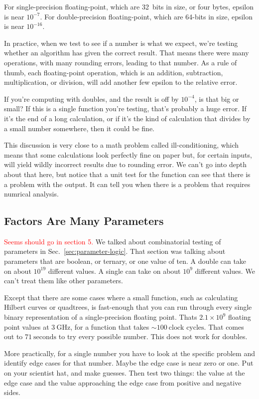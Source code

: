 \documentclass[fleqn,10pt]{olplainarticle}
\newcommand{\aside}[1]{\textcolor{red}{#1}}
\begin{document}
For single-precision floating-point, which are 32~bits in size,
or four bytes, epsilon is near $10^{-7}$. For double-precision
floating-point, which are 64-bits in size, epsilon is near
$10^{-16}$.

In practice, when we test to see if a number is what we expect,
we're testing whether an algorithm has given the correct result.
That means there were many operations, with many rounding errors,
leading to that number. As a rule of thumb, each floating-point
operation, which is an addition, subtraction, multiplication,
or division, will add another few epsilon to the relative error.

If you're computing with doubles, and the result is off by $10^{-4}$,
is that big or small? If this is a single function you're testing,
that's probably a huge error. If it's the end of a long calculation,
or if it's the kind of calculation that divides by a small number somewhere,
then it could be fine.

This discussion is very close to a math problem called ill-conditioning,
which means that some calculations look perfectly fine on paper
but, for certain inputs, will yield wildly incorrect results due
to rounding error. We can't go into depth about that here, but notice
that a unit test for the function can see that there
is a problem with the output. It can tell you when there is a problem
that requires numrical analysis.


\subsection{Factors Are Many Parameters}
\aside{Seems should go in section 5.}
We talked about combinatorial testing of parameters
in Sec.~\ref{sec:parameter-logic}. That section was talking about
parameters that are boolean, or ternary, or one value of ten.
A double can take on about $10^{19}$ different values. A single
can take on about $10^9$ different values. We can't treat them
like other parameters.

Except that there are some cases where a small function,
such as calculating Hilbert curves or quadtrees, is fast-enough
that you can run through every single binary representation of
a single-precision floating point. Thats $2.1\times 10^9$ floating
point values at $3\:\mbox{GHz}$, for a function that takes
$\sim 100\:\mbox{clock cycles}$. That comes out to $71\:\mbox{seconds}$
to try every possible number. This does not work for doubles.

More practically, for a single number you have to look at
the specific problem and identify edge cases for that number.
Maybe the edge case is near zero or one. Put on your scientist
hat, and make guesses. Then test two things: the value at the
edge case and the value approaching the edge case from positive
and negative sides.
\end{document}
